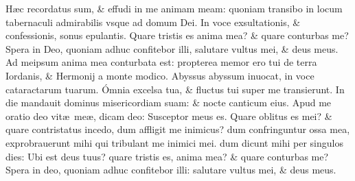 \documentclass[a5paper,10pt]{book}
\def\ae{æ}
\begin{document}
\begin{multicols*}{2}
\newline \color{red} H\color{black}\ae c recordatus sum, \& effudi in me animam meam: quoniam transibo in locum tabernaculi admirabilis vsque ad domum Dei.
\newline \color{red} I\color{black}n voce exsultationis, \& confessionis, sonus epulantis.
\newline \color{red} Q\color{black}uare tristis es anima mea? \& quare conturbas me?
\newline \color{red} S\color{black}pera in Deo, quoniam adhuc confitebor illi, salutare vultus mei, \& deus meus.
\newline \color{red} A\color{black}d meipsum anima mea conturbata est: propterea memor ero tui de terra Iordanis, \& Hermonij a monte modico.%
\newline \color{red} A\color{black}byssus abyssum inuocat, in voce cataractarum tuarum.
\newline \color{red} Ó\color{black}mnia excelsa tua, \& fluctus tui super me transierunt.
\newline \color{red} I\color{black}n die mandauit dominus misericordiam suam: \& nocte canticum eius.
\newline \color{red} A\color{black}pud me oratio deo vit\ae \ me\ae , dicam deo: Susceptor meus es.
\newline \color{red} Q\color{black}uare oblitus es mei? \& quare contristatus incedo, dum affligit me inimicus?
\newline \color{red} d\color{black}um confringuntur ossa mea, exprobrauerunt mihi qui tribulant me inimici mei.
\newline \color{red} d\color{black}um dicunt mihi per singulos dies: Ubi est deus tuus? quare tristis es, anima mea? \& quare conturbas me?
\newline \color{red} S\color{black}pera in deo, quoniam adhuc confitebor illi: salutare vultus mei, \& deus meus.

\end{multicols*}
\end{document}
